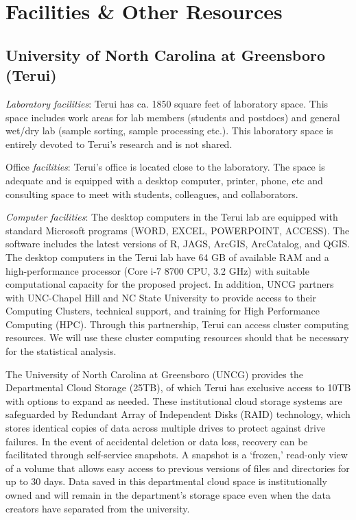 \documentclass[12pt, class=article, crop=false]{standalone}
\begin{document}
\section*{Facilities \& Other Resources}

\subsection*{University of North Carolina at Greensboro (Terui)}

\textit{Laboratory facilities}: Terui has ca. 1850 square feet of laboratory space.
This space includes work areas for lab members (students and postdocs) and general wet/dry lab (sample sorting, sample processing etc.).
This laboratory space is entirely devoted to Terui's research and is not shared.

Office \textit{facilities}: Terui's office is located close to the laboratory.
The space is adequate and is equipped with a desktop computer, printer, phone, etc and consulting space to meet with students, colleagues, and collaborators.

\textit{Computer facilities}: The desktop computers in the Terui lab are equipped with standard Microsoft programs
(WORD, EXCEL, POWERPOINT, ACCESS).
The software includes the latest versions of R, JAGS, ArcGIS, ArcCatalog, and QGIS.
The desktop computers in the Terui lab have 64 GB of available RAM and a high-performance processor (Core i-7 8700 CPU, 3.2 GHz) with suitable computational capacity for the proposed project.
In addition, UNCG partners with UNC-Chapel Hill and NC State University to provide access to their Computing Clusters, technical support, and training for High Performance Computing (HPC).
Through this partnership, Terui can access cluster computing resources.
We will use these cluster computing resources should that be necessary for the statistical analysis.

The University of North Carolina at Greensboro (UNCG) provides the Departmental Cloud Storage (25TB), of which Terui has exclusive access to 10TB with options to expand as needed.
These institutional cloud storage systems are safeguarded by Redundant Array of Independent Disks (RAID) technology, which stores identical copies of data across multiple drives to protect against drive failures.
In the event of accidental deletion or data loss, recovery can be facilitated through self-service snapshots.
A snapshot is a ‘frozen,’ read-only view of a volume that allows easy access to previous versions of files and directories for up to 30 days. 
Data saved in this departmental cloud space is institutionally owned and will remain in the department’s storage space even when the data creators have separated from the university.
\end{document}
